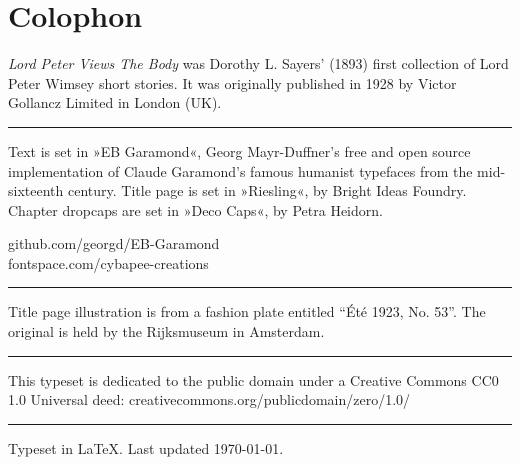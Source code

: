 \documentclass[
a5paper,
]{scrbook} %
\begin{document}
\frontmatter
\begin{titlepage}
 
\end{titlepage}




\tableofcontents





\mainmatter
\pagestyle{headings}
\renewcommand*{\chapterpagestyle}{plain}
















\clearpage
{}
\chapter*{Colophon}
\begin{center}
\begin{minipage}{\textwidth}
\textit{Lord Peter Views The Body} was Dorothy L. Sayers' (1893) first collection of Lord Peter Wimsey short stories. It was originally published in 1928 by Victor Gollancz Limited in London (UK).
\end{minipage}
\vfill
\rule{0.5\textwidth}{.4pt}
\vfill

\begin{minipage}{\textwidth}
Text is set in »EB Garamond«, Georg Mayr-Duffner's free and open source implementation of Claude Garamond’s famous humanist typefaces from the mid-sixteenth century. Title page is set in »Riesling«, by Bright Ideas Foundry. Chapter dropcaps are set in »Deco Caps«, by Petra Heidorn.
\end{minipage}
\vfill
github.com/georgd/EB-Garamond\\fontspace.com/cybapee-creations
\vfill
\rule{0.5\textwidth}{.4pt}
\vfill
\begin{minipage}{\textwidth}
Title page illustration is from a fashion plate entitled \foreignquote{french}{Été 1923, No. 53}. The original is held by the Rijksmuseum in Amsterdam.
\end{minipage}
\vfill
\rule{0.5\textwidth}{.4pt}
\vfill

\begin{minipage}{\textwidth}
This typeset is dedicated to the public domain under a Creative Commons CC0 1.0 Universal deed: creativecommons.org/publicdomain/zero/1.0/
\end{minipage}
\vfill
\rule{0.5\textwidth}{.4pt}
\vfill
Typeset in \LaTeX{}. Last updated \today.
\end{center}
\thispagestyle{empty}
\end{document}
